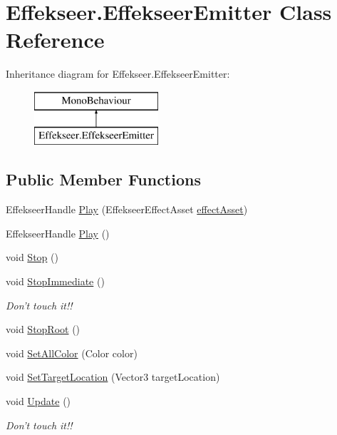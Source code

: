 \hypertarget{class_effekseer_1_1_effekseer_emitter}{\section{Effekseer.\-Effekseer\-Emitter Class Reference}
\label{class_effekseer_1_1_effekseer_emitter}
}
Inheritance diagram for Effekseer.\-Effekseer\-Emitter\-:\begin{figure}[H]
\begin{center}
\leavevmode
\includegraphics[height=2.000000cm]{class_effekseer_1_1_effekseer_emitter}
\end{center}
\end{figure}
\subsection*{Public Member Functions}
\begin{DoxyCompactItemize}
\item 
Effekseer\-Handle \hyperlink{class_effekseer_1_1_effekseer_emitter_ac06309feaf1798ef0e9553acd75b7ff0}{Play} (Effekseer\-Effect\-Asset \hyperlink{class_effekseer_1_1_effekseer_emitter_abba9195b883a45a4bcc6dcc626173ce9}{effect\-Asset})
\item 
Effekseer\-Handle \hyperlink{class_effekseer_1_1_effekseer_emitter_a82980eeb34709e01cdf5a792e7b4d4c0}{Play} ()
\item 
void \hyperlink{class_effekseer_1_1_effekseer_emitter_a8fe81f1b2f4382e9af35f7cd8722e9d4}{Stop} ()
\item 
void \hyperlink{class_effekseer_1_1_effekseer_emitter_aaf6ca5a2a1a9bc6ed75fd377b415f415}{Stop\-Immediate} ()
\begin{DoxyCompactList}\small\item\em Don't touch it!! \end{DoxyCompactList}\item 
void \hyperlink{class_effekseer_1_1_effekseer_emitter_a49db7f1310c5cab69e72b871c9b666f8}{Stop\-Root} ()
\item 
void \hyperlink{class_effekseer_1_1_effekseer_emitter_a2c3d101b365dfb035f222373958ec3fa}{Set\-All\-Color} (Color color)
\item 
void \hyperlink{class_effekseer_1_1_effekseer_emitter_ac516088d0c7a88124afd5816f103d943}{Set\-Target\-Location} (Vector3 target\-Location)
\item 
void \hyperlink{class_effekseer_1_1_effekseer_emitter_af1bb2b07842a6e671d3c938e4e5ddc28}{Update} ()
\begin{DoxyCompactList}\small\item\em Don't touch it!! \end{DoxyCompactList}\end{DoxyCompactItemize}
